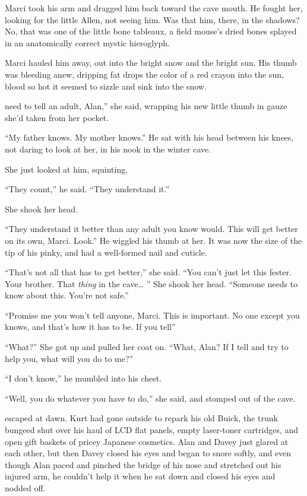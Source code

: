 Marci took his arm and dragged him back toward the cave mouth.  He
fought her, looking for the little Allen, not seeing him.  Was that
him, there, in the shadows?  No, that was one of the little bone
tableaux, a field mouse's dried bones splayed in an anatomically
correct mystic hieroglyph.

Marci hauled him away, out into the bright snow and the bright sun. 
His thumb was bleeding anew, dripping fat drops the color of a red
crayon into the sun, blood so hot it seemed to sizzle and sink into
the snow.

need to tell an adult, Alan,'' she said, wrapping his new little
thumb in gauze she'd taken from her pocket.

``My father knows.  My mother knows.'' He sat with his head between
his knees, not daring to look at her, in his nook in the winter cave.

She just looked at him, squinting.

``They count,'' he said.  ``They understand it.''

She shook her head.

``They understand it better than any adult you know would.  This will
get better on its own, Marci.  Look.'' He wiggled his thumb at her. 
It was now the size of the tip of his pinky, and had a well-formed
nail and cuticle.

``That's not all that has to get better,'' she said.  ``You can't just
let this fester.  Your brother.  That \textit{thing} in the cave\ldots{} 
'' She shook her head.  ``Someone needs to know about this.  You're
not safe.''

``Promise me you won't tell anyone, Marci.  This is important.  No one
except you knows, and that's how it has to be.  If you tell\dash{}''

``What?'' She got up and pulled her coat on.  ``What, Alan?  If I tell
and try to help you, what will you do to me?''

``I don't know,'' he mumbled into his chest.

``Well, you do whatever you have to do,'' she said, and stomped out of
the cave.

 escaped at dawn.  Kurt had gone outside to repark his old Buick,
the trunk bungeed shut over his haul of LCD flat panels, empty
laser-toner cartridges, and open gift baskets of pricey Japanese
cosmetics.  Alan and Davey just glared at each other, but then Davey
closed his eyes and began to snore softly, and even though Alan paced
and pinched the bridge of his nose and stretched out his injured arm,
he couldn't help it when he sat down and closed his eyes and nodded
off.

